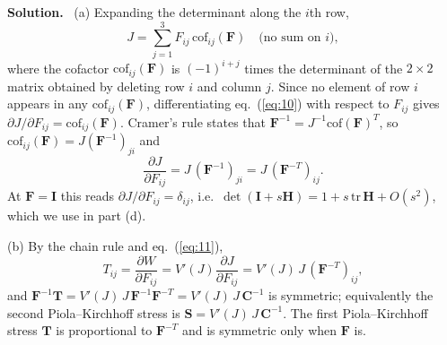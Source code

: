 \documentclass[a4paper,12pt]{paper}
\newenvironment{solution}{\par\noindent\textbf{Solution.}\ }{\par\medskip}
\begin{document}
\begin{solution}
(a) Expanding the determinant along the $i$th row,
\begin{equation}
J=\sum_{j=1}^{3}F_{ij}\,\mathrm{cof}_{ij}(\mathbf{F})\quad\text{(no sum on $i$)},
\label{eq:10}
\end{equation}
where the cofactor $\mathrm{cof}_{ij}(\mathbf{F})$ is $(-1)^{i+j}$ times the determinant of the
$2\times2$ matrix obtained by deleting row $i$ and column $j$. Since no element of row $i$ appears in
any $\mathrm{cof}_{ij}(\mathbf{F})$, differentiating eq.~(\ref{eq:10}) with respect to
$F_{ij}$ gives $\partial J/\partial F_{ij}=\mathrm{cof}_{ij}(\mathbf{F})$. Cramer's rule states that
$\mathbf{F}^{-1}=J^{-1}\mathrm{cof}(\mathbf{F})^{T}$, so $\mathrm{cof}_{ij}(\mathbf{F})=J(\mathbf{F}^{-1})_{ji}$ and
\begin{equation}
\frac{\partial J}{\partial F_{ij}}=J\,(\mathbf{F}^{-1})_{ji}=J\,(\mathbf{F}^{-T})_{ij}.
\label{eq:11}
\end{equation}
At $\mathbf{F}=\mathbf{I}$ this reads $\partial J/\partial F_{ij}=\delta_{ij}$, i.e.\
$\det(\mathbf{I}+s\mathbf{H})=1+s\,\mathrm{tr}\,\mathbf{H}+O(s^{2})$, which we use in part (d).

(b) By the chain rule and eq.~(\ref{eq:11}),
\begin{equation}
T_{ij}=\frac{\partial W}{\partial F_{ij}}=V'(J)\frac{\partial J}{\partial F_{ij}}=V'(J)\,J\,(\mathbf{F}^{-T})_{ij},
\label{eq:12}
\end{equation}
and $\mathbf{F}^{-1}\mathbf{T}=V'(J)\,J\,\mathbf{F}^{-1}\mathbf{F}^{-T}=V'(J)\,J\,\mathbf{C}^{-1}$ is
symmetric; equivalently the second Piola--Kirchhoff stress is $\mathbf{S}=V'(J)\,J\,\mathbf{C}^{-1}$.
The first Piola--Kirchhoff stress $\mathbf{T}$ is proportional to $\mathbf{F}^{-T}$ and is
symmetric only when $\mathbf{F}$ is.


\end{solution}
\end{document}
